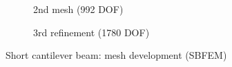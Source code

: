 \begin{figure}[h!]
\begin{subfigure}[b]{0.4\linewidth}
{        }
        \caption{2nd mesh (992 DOF)}
    \end{subfigure}
    \begin{subfigure}[b]{0.4\linewidth}
        \centering
        \caption{3rd refinement (1780 DOF)}
    \end{subfigure}
    \caption{ Short cantilever beam: mesh development (SBFEM)}
    \label{adap_fig:ex_short_cantilever_mesh_develpment}
\end{figure}

